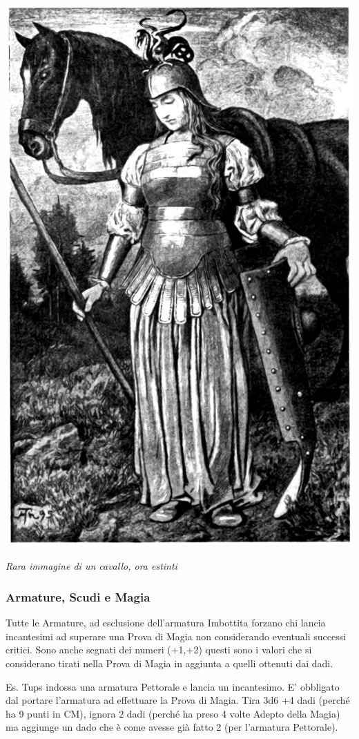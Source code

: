 \begin{multicols}{2}
\begin{center}
	\includegraphics[width=0.75\linewidth]{immagini/donnacavalierecavallo.png}

	\emph{Rara immagine di un cavallo, ora estinti}
\end{center}

\subsubsection{Armature, Scudi e Magia}\hypertarget{armatureemagie}{}\label{armatureemagie}

Tutte le Armature, ad esclusione dell'armatura Imbottita forzano chi lancia incantesimi ad superare una Prova di Magia non considerando eventuali successi critici. Sono anche segnati dei numeri (+1,+2) questi sono i valori che si considerano tirati nella Prova di Magia in aggiunta a quelli ottenuti dai dadi.

Es. Tups indossa una armatura Pettorale e lancia un incantesimo. E' obbligato dal portare l'armatura ad effettuare la Prova di Magia. Tira 3d6 +4 dadi (perché ha 9 punti in CM), ignora 2 dadi (perché ha preso 4 volte Adepto della Magia) ma aggiunge un dado che è come avesse già fatto 2 (per l'armatura Pettorale).


\end{multicols}
